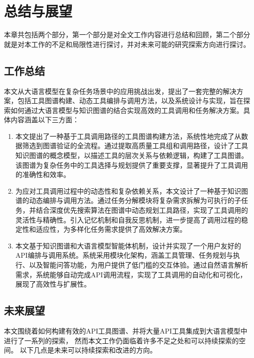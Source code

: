 
\chapter{总结与展望}

\indent 本章共包括两个部分，第一个部分是对全文工作内容进行总结和回顾，第二个部分就是对本工作的不足和局限性进行探讨，并对未来可能的研究探索方向进行探讨。

\section{工作总结}

本文从大语言模型在复杂任务场景中的应用挑战出发，提出了一套完整的解决方案，包括工具图谱构建、动态工具编排与调用方法，以及系统设计与实现，旨在探索如何通过大语言模型与知识图谱的结合实现高效的工具调用和任务解决方案。具体内容涵盖以下三方面：

\begin{enumerate}
    \item 本文提出了一种基于工具调用路径的工具图谱构建方法，系统性地完成了从数据筛选到图谱验证的全流程。通过提取高质量工具组和调用路径，设计了工具知识图谱的概念模型，以描述工具的层次关系与依赖逻辑，构建了工具图谱。该图谱为复杂任务中的工具选择与规划提供了重要支撑，显著提升了工具调用的准确性和效率。
    \item 为应对工具调用过程中的动态性和复杂依赖关系，本文设计了一种基于知识图谱的动态编排与调用方法。通过任务分解模块将复杂需求拆解为可执行的子任务，并结合深度优先搜索算法在图谱中动态规划工具路径，实现了工具调用的灵活性与精确性。引入记忆机制和自我反思机制，进一步提高了调用过程的稳定性和适应性，为多样化任务需求提供了高效解决方案。
    \item 本文基于知识图谱和大语言模型智能体机制，设计并实现了一个用户友好的API编排与调用系统。系统采用模块化架构，涵盖工具管理、任务规划与执行、以及智能问答功能，为用户提供了低门槛的交互体验。通过自然语言解析需求，系统能够自动完成API调用流程，实现了工具调用的自动化和可视化，展现了高效性与扩展性。
\end{enumerate}

\section{未来展望}

本文围绕着如何构建有效的API工具图谱、并将大量API工具集成到大语言模型中进行了一系列的探索，
然而本文工作仍面临着许多不足之处和可以持续探索的空间。
以下几点是未来可以持续探索和改进的方向。

